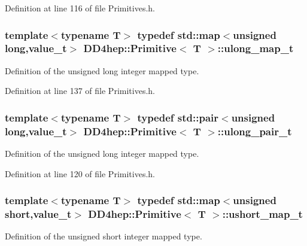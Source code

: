 Definition at line 116 of file Primitives.h.\hypertarget{struct_d_d4hep_1_1_primitive_ab4ba00823c6afd9907a1d53af783d2fe}{
\subsubsection[{ulong\_\-map\_\-t}]{\setlength{\rightskip}{0pt plus 5cm}template$<$typename T$>$ typedef std::map$<$unsigned long,{\bf value\_\-t}$>$ {\bf DD4hep::Primitive}$<$ {\bf T} $>$::{\bf ulong\_\-map\_\-t}}}
\label{struct_d_d4hep_1_1_primitive_ab4ba00823c6afd9907a1d53af783d2fe}


Definition of the unsigned long integer mapped type. 

Definition at line 137 of file Primitives.h.\hypertarget{struct_d_d4hep_1_1_primitive_a776a90beccb1b044c258b851c8128509}{
\subsubsection[{ulong\_\-pair\_\-t}]{\setlength{\rightskip}{0pt plus 5cm}template$<$typename T$>$ typedef std::pair$<$unsigned long,{\bf value\_\-t}$>$ {\bf DD4hep::Primitive}$<$ {\bf T} $>$::{\bf ulong\_\-pair\_\-t}}}
\label{struct_d_d4hep_1_1_primitive_a776a90beccb1b044c258b851c8128509}


Definition of the unsigned long integer mapped type. 

Definition at line 120 of file Primitives.h.\hypertarget{struct_d_d4hep_1_1_primitive_a05bca6a7dcdad2a935793e45d9746079}{
\subsubsection[{ushort\_\-map\_\-t}]{\setlength{\rightskip}{0pt plus 5cm}template$<$typename T$>$ typedef std::map$<$unsigned short,{\bf value\_\-t}$>$ {\bf DD4hep::Primitive}$<$ {\bf T} $>$::{\bf ushort\_\-map\_\-t}}}
\label{struct_d_d4hep_1_1_primitive_a05bca6a7dcdad2a935793e45d9746079}


Definition of the unsigned short integer mapped type. 

